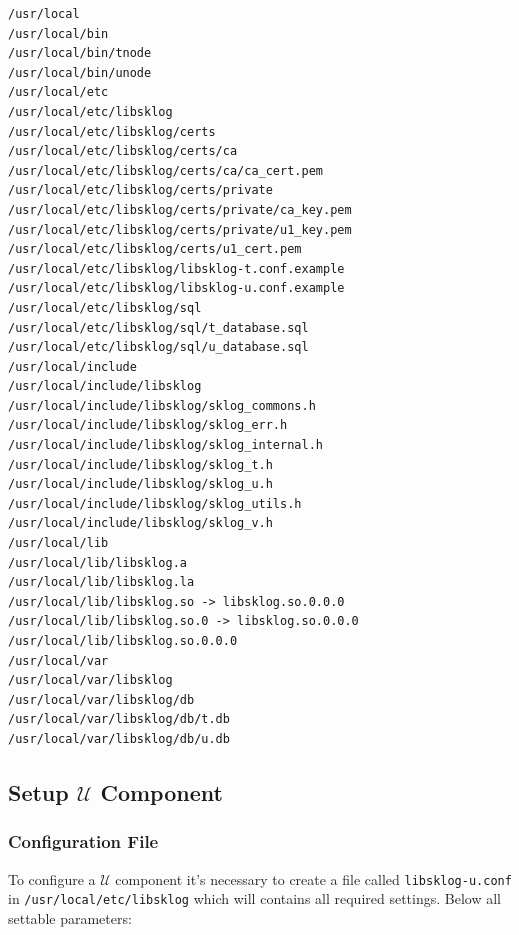 \documentclass[a4paper,12pt]{article}
\def\u{$\mathcal{U}$\xspace}
\begin{document}
\begin{lstlisting}
/usr/local
/usr/local/bin
/usr/local/bin/tnode
/usr/local/bin/unode
/usr/local/etc
/usr/local/etc/libsklog
/usr/local/etc/libsklog/certs
/usr/local/etc/libsklog/certs/ca
/usr/local/etc/libsklog/certs/ca/ca_cert.pem
/usr/local/etc/libsklog/certs/private
/usr/local/etc/libsklog/certs/private/ca_key.pem
/usr/local/etc/libsklog/certs/private/u1_key.pem
/usr/local/etc/libsklog/certs/u1_cert.pem
/usr/local/etc/libsklog/libsklog-t.conf.example
/usr/local/etc/libsklog/libsklog-u.conf.example
/usr/local/etc/libsklog/sql
/usr/local/etc/libsklog/sql/t_database.sql
/usr/local/etc/libsklog/sql/u_database.sql
/usr/local/include
/usr/local/include/libsklog
/usr/local/include/libsklog/sklog_commons.h
/usr/local/include/libsklog/sklog_err.h
/usr/local/include/libsklog/sklog_internal.h
/usr/local/include/libsklog/sklog_t.h
/usr/local/include/libsklog/sklog_u.h
/usr/local/include/libsklog/sklog_utils.h
/usr/local/include/libsklog/sklog_v.h
/usr/local/lib
/usr/local/lib/libsklog.a
/usr/local/lib/libsklog.la
/usr/local/lib/libsklog.so -> libsklog.so.0.0.0
/usr/local/lib/libsklog.so.0 -> libsklog.so.0.0.0
/usr/local/lib/libsklog.so.0.0.0
/usr/local/var
/usr/local/var/libsklog
/usr/local/var/libsklog/db
/usr/local/var/libsklog/db/t.db
/usr/local/var/libsklog/db/u.db
\end{lstlisting}



\subsection{Setup $\mathcal{U}$ Component}

\subsubsection{Configuration File}

To configure a \u component it's necessary to create a file
called \texttt{libsklog-u.conf} in \texttt{/usr/local/etc/libsklog}
which will contains all required settings. Below all settable parameters:
\end{document}
